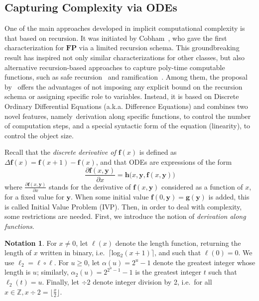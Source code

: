 \documentclass[11pt, oneside]{article}
\newcommand{\FP}{\mathbf{FP}}
\newcommand{\tu}[1]{\mathbf{#1}}
\theoremstyle{definition}
\newtheorem{notation}{Notation}
\begin{document}
\subsection{Capturing Complexity via ODEs}

One of the main approaches developed in implicit computational complexity is that based on recursion.
It was initiated by Cobham~\cite{Cobham}, who gave the first characterization for $\FP$ via a limited recursion schema. 
%
This groundbreaking result has inspired not only similar characterizations for other classes, but also alternative recursion-based approaches to capture poly-time computable functions, such as safe recursion~\cite{BellantoniCook} and ramification~\cite{Leivant,LeivantMarion}.
%
Among them, the proposal by~\cite{BournezDurand19} offers the advantages of not imposing any explicit bound on the recursion schema or assigning specific role to variables.
%
Instead, it is based on Discrete Ordinary Differential Equations (a.k.a. Difference Equations) and combines two novel features, namely~derivation along specific functions, to control the number of computation steps, and a special syntactic form of the equation %
(linearity),  to control the object size. 


Recall that the \emph{discrete derivative of $\tu f(x)$} is defined as $\Delta \tu f(x) = \tu f(x+1) - \tu f(x)$, and that ODEs are expressions of the form 
$$
\frac{\partial \tu f(x, \tu y)}{\partial x} = \tu h\big(x,\tu y, \tu f(x, \tu y)\big)
$$ 
where $\frac{\partial \tu f(x, \tu y)}{\partial x}$ stands for the derivative of $\tu f(x, \tu y)$ considered as a function of $x$, for a fixed value for $\tu y$.
%
When some initial value $\tu f(0, \tu y) = \tu g(\tu y)$ is added, this is called Initial Value Problem (IVP).
%
%
Then, in order to deal with complexity, some restrictions are needed. 
%
First, we introduce the notion of \emph{derivation along functions}.




\begin{notation}
    For $x\neq 0$, let $\ell(x)$ denote the length function, returning the length of $x$ written in binary, i.e.~$\lceil$log$_2(x+1)\rceil$, and such that $\ell(0)=0$. 
    We use $\ell_2=\ell\circ\ell$.
    For $u\ge 0$, let $\alpha(u)=2^u-1$ denote the greatest integer whose length is $u$; similarly, $\alpha_2(u)=2^{2^u-1}-1$ is the greatest integer $t$ such that $\ell_2(t)=u$. 
    Finally, let $\div 2$ denote integer division by 2, i.e.~for all $x\in \mathbb{Z}, x \div 2 = \big\lfloor \frac{x}{2}\big\rfloor$.
\end{notation}
\end{document}
